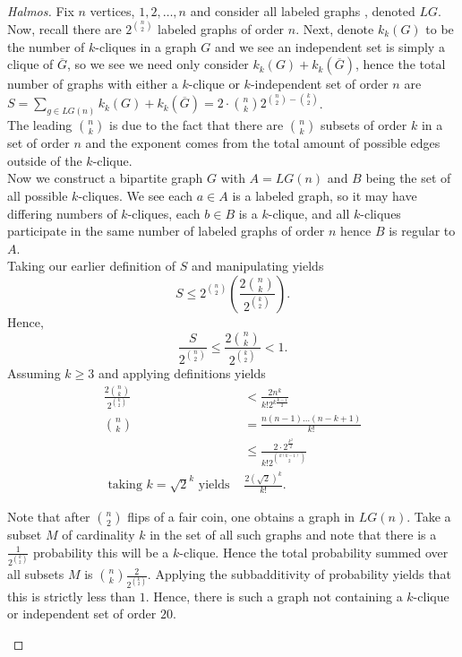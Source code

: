 \begin{proof}[Halmos]
	Fix \(n\) vertices, \(1, 2, \ldots, n\)	 and consider all labeled graphs
	, denoted \(LG\). Now, recall there are \(2^{\binom{n}{2}}\) labeled graphs of order \(n\). Next, denote \(k_k \left( G \right)  \) to be the number of \(k\)-cliques in a graph \(G\) and we see an independent set is simply a clique of \(\overline{G}\), so we see we need only consider \(k_{k} \left( G \right) + k_{k}\left( \overline{G} \right) \), hence the total number of graphs with either a \(k\)-clique or \(k\)-independent set of order \(n\) are \(S = \sum_{g \in LG\left( n \right) }^{}k_{k}\left( G \right)  + k_{k}\left( \overline{G} \right) = 2\cdot \binom{n}{k} 2^{\binom{n}{2} - \binom{k}{2}} \).\\
The leading \(\binom{n}{k}\) is due to the fact that there are \(\binom{n}{k}\) subsets of order \(k\) in a set of order \(n\) and the exponent comes from the total amount of possible edges outside of the \(k\)-clique.\\
Now we construct a bipartite graph \(G\) with \(A= LG\left( n \right) \)  and \(B\) being the set of all possible \(k\)-cliques. We see each \(a \in A\) is a labeled graph, so it may have differing numbers of \(k\)-cliques, each \(b \in B\)  is a \(k\)-clique, and all \(k\)-cliques participate in the same number of labeled graphs of order \(n\) hence \(B\) is regular to \(A\).\\
Taking our earlier definition of \(S\) and manipulating yields \[
	S \le 2^{\binom{n}{2}} \left( \frac{2 \binom{n}{k} }{2^{\binom{k}{2}}} \right)
.\]
Hence, \[
	\frac{S}{2^{\binom{n}{2}}} \le \frac{2\binom{n}{k}}{2^{\binom{k}{2}}} < 1
.\]
Assuming \(k \ge 3\) and applying definitions yields
\begin{align*}
	\frac{2\binom{n}{k}}{2^{\binom{k}{2}}} &< \frac{2n^{k}}{k! 2^{k\frac{ k-1 }{2}}}\\
	\binom{n}{k} &= \frac{n\left( n-1 \right) \ldots \left( n - k +1 \right)  }{k!}\\
					       &\le \frac{2 \cdot 2^{\frac{k^2}{2}}}{k! 2^{\binom{k\left( k-1 \right) }{2}}} \\
			       \text{ taking \(k = \sqrt{2} ^{k}\) yields } & \frac{2\left( \sqrt{2}  \right) ^{k}}{k!}
.\end{align*}
\begin{remark}
	Note that after \(\binom{n}{2}\) flips of a fair coin, one obtains a graph in \(LG\left( n \right) \). Take a subset \(M\) of cardinality \(k\) in the set of all such graphs and note that there is a \(\frac{1}{2^{\binom{k}{2}}}\) probability this will be a \(k\)-clique. Hence the total probability summed over all subsets \(M\) is \(\binom{n}{k}\frac{2}{2^{\binom{k}{2}}}\). Applying the subbadditivity of probability yields that this is strictly less than \(1\). Hence, there is such a graph not containing a \(k\)-clique or independent set of order \(20\).
\end{remark}
\end{proof}
